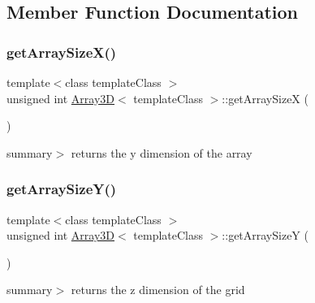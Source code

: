\subsection{Member Function Documentation}
\mbox{\label{class_array3_d_a5c406bcb6868cb65acb6ac1f593d743e}} 
\subsubsection{\texorpdfstring{get\+Array\+Size\+X()}{getArraySizeX()}}
{\footnotesize\ttfamily template$<$class template\+Class $>$ \\
unsigned int \hyperlink{class_array3_d}{Array3D}$<$ template\+Class $>$\+::get\+Array\+SizeX (\begin{DoxyParamCaption}{ }\end{DoxyParamCaption})\hspace{0.3cm}{\ttfamily [inline]}}



summary$>$ returns the y dimension of the array

\mbox{\label{class_array3_d_a1d60c3290d17e30e1e5854f296bba68b}} 
\subsubsection{\texorpdfstring{get\+Array\+Size\+Y()}{getArraySizeY()}}
{\footnotesize\ttfamily template$<$class template\+Class $>$ \\
unsigned int \hyperlink{class_array3_d}{Array3D}$<$ template\+Class $>$\+::get\+Array\+SizeY (\begin{DoxyParamCaption}{ }\end{DoxyParamCaption})\hspace{0.3cm}{\ttfamily [inline]}}



summary$>$ returns the z dimension of the grid

\mbox{\label{class_array3_d_ac16b3ce3f37d597033a7b7fd1fdb5e41}} 
